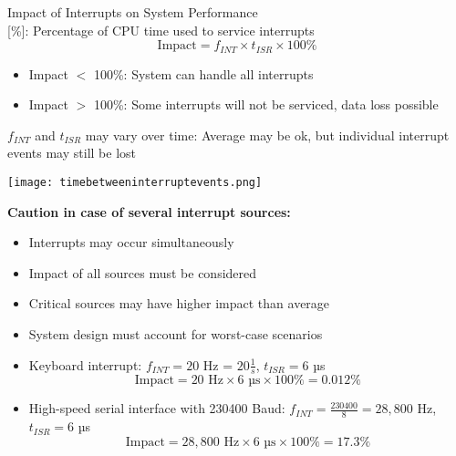 \begin{theorem}{Impact of Interrupts on System Performance}\\
 [\%]: Percentage of CPU time used to service interrupts
$$\text{Impact} = f_{INT} \times t_{ISR} \times 100\%$$
    \begin{itemize}
        \item Impact $<$ 100\%: System can handle all interrupts
        \item Impact $>$ 100\%: Some interrupts will not be serviced, data loss possible
    \end{itemize}
$f_{INT}$ and $t_{ISR}$ may vary over time: Average may be ok, but individual interrupt events may still be lost

\texttt{[image: timebetweeninterruptevents.png]}

\textbf{Caution in case of several interrupt sources:}
    \begin{itemize}
        \item Interrupts may occur simultaneously
        \item Impact of all sources must be considered
        \item Critical sources may have higher impact than average
        \item System design must account for worst-case scenarios
    \end{itemize}
    
\end{theorem}

\begin{example}
    \begin{itemize}
    \item Keyboard interrupt: $f_{INT} = 20$ Hz = $20 \frac{1}{s}$, $t_{ISR} = 6$ µs
    $$
    \text{Impact} = 20 \text{ Hz} \times 6 \text{ µs} \times 100\% = 0.012\%
    $$

    \item High-speed serial interface with 230400 Baud: $f_{INT} = \frac{230400}{8} = 28,800$ Hz, $t_{ISR} = 6$ µs
   $$
    \text{Impact} = 28,800 \text{ Hz} \times 6 \text{ µs} \times 100\% = 17.3\%
   $$
\end{itemize}
\end{example}


